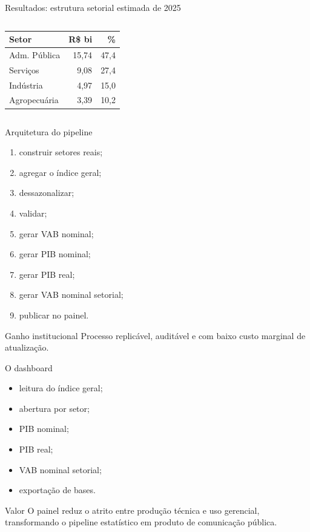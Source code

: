 \documentclass[aspectratio=169,11pt]{beamer}
\begin{document}
\begin{frame}{Resultados: estrutura setorial estimada de 2025}
\begin{columns}[T]
\small
\begin{tabular}{lrr}
\toprule
\textbf{Setor} & \textbf{R\$ bi} & \textbf{\%} \\
\midrule
Adm. Pública & 15,74 & 47,4 \\
Serviços & 9,08 & 27,4 \\
Indústria & 4,97 & 15,0 \\
Agropecuária & 3,39 & 10,2 \\
\bottomrule
\end{tabular}

\centering
{}
\end{columns}
\end{frame}

\begin{frame}{Arquitetura do pipeline}
\begin{enumerate}
  \item construir setores reais;
  \item agregar o índice geral;
  \item dessazonalizar;
  \item validar;
  \item gerar VAB nominal;
  \item gerar PIB nominal;
  \item gerar PIB real;
  \item gerar VAB nominal setorial;
  \item publicar no painel.
\end{enumerate}

\begin{block}{Ganho institucional}
Processo replicável, auditável e com baixo custo marginal de atualização.
\end{block}
\end{frame}

\begin{frame}{O dashboard}
\begin{itemize}
  \item leitura do índice geral;
  \item abertura por setor;
  \item PIB nominal;
  \item PIB real;
  \item VAB nominal setorial;
  \item exportação de bases.
\end{itemize}

\vspace{0.3cm}
\begin{block}{Valor}
O painel reduz o atrito entre produção técnica e uso gerencial, transformando o pipeline estatístico em produto de comunicação pública.
\end{block}
\end{frame}
\end{document}
